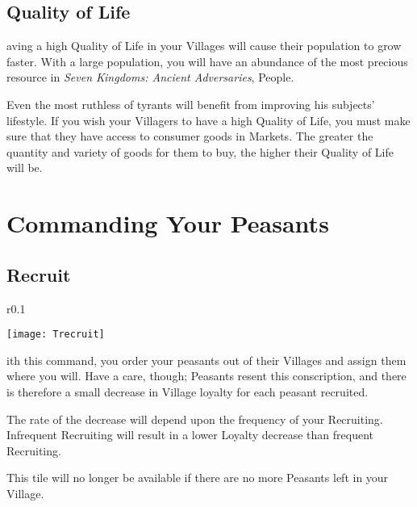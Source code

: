 \subsection{Quality of Life}


aving a high Quality of Life in your Villages will cause their population to grow faster. With a large population, you will have an abundance of the most precious resource in \textit{Seven Kingdoms: Ancient Adversaries}, People.

Even the most ruthless of tyrants will benefit from improving his subjects’ lifestyle. If you wish your Villagers to have a high Quality of Life, you must make sure that they have access to consumer goods in Markets. The greater the quantity and variety of goods for them to buy, the higher their Quality of Life will be.

\section{\textsf{Commanding Your Peasants}}


\subsection{\textsf{Recruit}}


\begin{wrapfigure}{r}{0.1\textwidth}
    \vspace{-20pt}
    \begin{center}
        \texttt{[image: Trecruit]}
    \end{center}
    \vspace{-20pt}
\end{wrapfigure}

ith this command, you order your peasants out of their Villages and assign them where you will. Have a care, though; Peasants resent this conscription, and there is therefore a small decrease in Village loyalty for each peasant recruited.

The rate of the decrease will depend upon the frequency of your Recruiting. Infrequent Recruiting will result in a lower Loyalty decrease than frequent Recruiting.

This tile will no longer be available if there are no more Peasants left in your Village.

